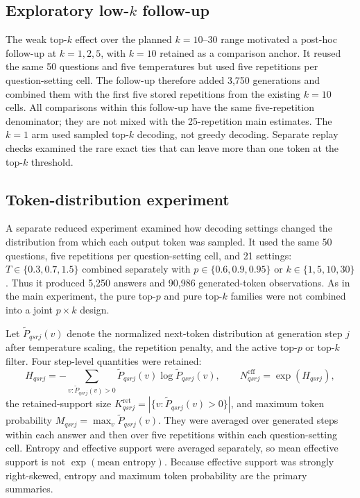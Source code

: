 \documentclass[11pt]{article}
\begin{document}
\subsection{Exploratory low-$k$ follow-up}

The weak top-$k$ effect over the planned $k=10$--30 range motivated a post-hoc
follow-up at $k=1,2,5$, with $k=10$ retained as a comparison anchor. It reused
the same 50 questions and five temperatures but used five repetitions per
question-setting cell. The follow-up therefore added 3,750 generations and
combined them with the first five stored repetitions from the existing
$k=10$ cells. All comparisons within this follow-up have the same
five-repetition denominator; they are not mixed with the 25-repetition main
estimates. The $k=1$ arm used sampled top-$k$ decoding, not greedy decoding.
Separate replay checks examined the rare exact ties that can leave more than
one token at the top-$k$ threshold.

\subsection{Token-distribution experiment}

A separate reduced experiment examined how decoding settings changed the
distribution from which each output token was sampled. It used the same 50
questions, five repetitions per question-setting cell, and 21 settings:
$T\in\{0.3,0.7,1.5\}$ combined separately with
$p\in\{0.6,0.9,0.95\}$ or $k\in\{1,5,10,30\}$. Thus it produced 5,250
answers and 90,986 generated-token observations. As in the main experiment,
the pure top-$p$ and pure top-$k$ families were not combined into a joint
$p\times k$ design.

Let $\widetilde P_{qsrj}(v)$ denote the normalized next-token distribution at
generation step $j$ after temperature scaling, the repetition penalty, and the
active top-$p$ or top-$k$ filter. Four step-level quantities were retained:
\[
 H_{qsrj}=-\sum_{v:\widetilde P_{qsrj}(v)>0}
 \widetilde P_{qsrj}(v)\log \widetilde P_{qsrj}(v),
 \qquad N^{\mathrm{eff}}_{qsrj}=\exp(H_{qsrj}),
\]
the retained-support size
$K^{\mathrm{ret}}_{qsrj}=|\{v:\widetilde P_{qsrj}(v)>0\}|$, and maximum token
probability $M_{qsrj}=\max_v\widetilde P_{qsrj}(v)$. They were averaged over
generated steps within each answer and then over five repetitions within each
question-setting cell. Entropy and effective support were averaged separately,
so mean effective support is not $\exp(\text{mean entropy})$. Because effective
support was strongly right-skewed, entropy and maximum token probability are
the primary summaries.
\end{document}
